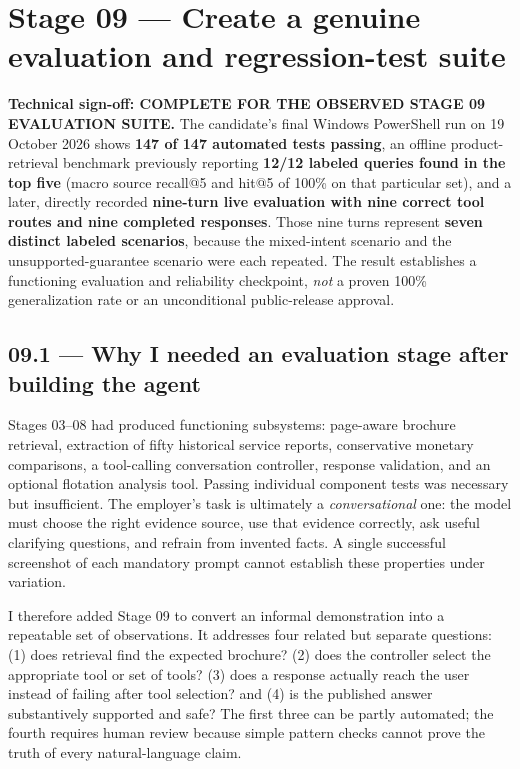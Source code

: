 \documentclass[11pt,a4paper]{article}
\begin{document}
\section{Stage 09 --- Create a genuine evaluation and regression-test suite}
\label{sec:stage09}
\begin{keybox}
\textbf{Technical sign-off: COMPLETE FOR THE OBSERVED STAGE 09 EVALUATION SUITE.}
The candidate's final Windows PowerShell run on 19 October 2026 shows \textbf{147 of 147 automated tests passing}, an offline product-retrieval benchmark previously reporting \textbf{12/12 labeled queries found in the top five} (macro source recall@5 and hit@5 of 100\% on that particular set), and a later, directly recorded \textbf{nine-turn live evaluation with nine correct tool routes and nine completed responses}. Those nine turns represent \textbf{seven distinct labeled scenarios}, because the mixed-intent scenario and the unsupported-guarantee scenario were each repeated. The result establishes a functioning evaluation and reliability checkpoint, \emph{not} a proven 100\% generalization rate or an unconditional public-release approval.
\end{keybox}

\subsection{09.1 --- Why I needed an evaluation stage after building the agent}
Stages 03--08 had produced functioning subsystems: page-aware brochure retrieval, extraction of fifty historical service reports, conservative monetary comparisons, a tool-calling conversation controller, response validation, and an optional flotation analysis tool. Passing individual component tests was necessary but insufficient. The employer's task is ultimately a \emph{conversational} one: the model must choose the right evidence source, use that evidence correctly, ask useful clarifying questions, and refrain from invented facts. A single successful screenshot of each mandatory prompt cannot establish these properties under variation.

I therefore added Stage 09 to convert an informal demonstration into a repeatable set of observations. It addresses four related but separate questions: (1) does retrieval find the expected brochure? (2) does the controller select the appropriate tool or set of tools? (3) does a response actually reach the user instead of failing after tool selection? and (4) is the published answer substantively supported and safe? The first three can be partly automated; the fourth requires human review because simple pattern checks cannot prove the truth of every natural-language claim.
\end{document}
